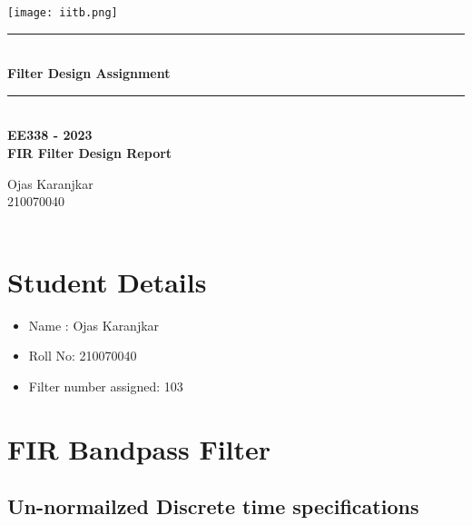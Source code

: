 \documentclass{article}
\begin{document}
\begin{titlepage}
\begin{center}
    \vspace*{\fill}
\texttt{[image: iitb.png]}\\
[4 cm]
    \rule{12.5cm}{0.75mm}\\
    \huge{\bfseries Filter Design Assignment}
    \rule{12.5cm}{0.75mm}\\
    [0.5cm]
   {\textbf {EE338 - 2023 \\
   FIR Filter Design Report}}\\
    [2.5cm]
\end{center}
\begin{flushleft}
   {\huge
    Ojas Karanjkar \\
    210070040 \\
     \\}
    \end{flushleft}
\end{titlepage}
\tableofcontents
\thispagestyle{empty}
\clearpage
{}

\newpage

\section{Student Details}
\begin{itemize}
    \item Name : Ojas Karanjkar
    \item Roll No: 210070040
    \item Filter number assigned: 103
\end{itemize}


\section{FIR Bandpass Filter}

\subsection{Un-normailzed Discrete time specifications}
\end{document}
